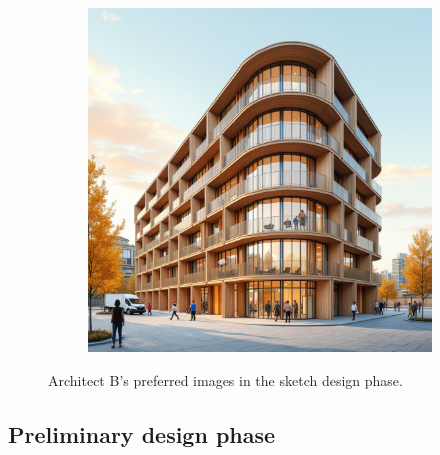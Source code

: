 \begin{figure}[H]
\begin{subfigure}[b]{0.3\textwidth}
        \includegraphics[width=\textwidth]{Images/Results/Architect B/1. Sketch phase/Zonder_lora_00002_.png}
        \caption{}
        \label{B-sketch-preferred-b}
    \end{subfigure}
    \caption{Architect B's preferred images in the sketch design phase.}
    \label{fig:B-sketch-preferred}
\end{figure}
\subsection{Preliminary design phase}
